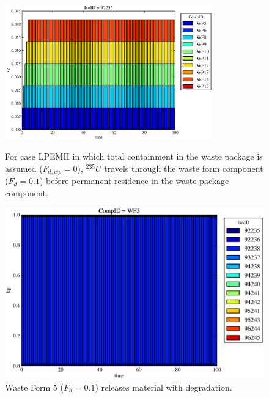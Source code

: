 \begin{figure}[ht]
\centering
\includegraphics[width=0.8\textwidth]{./chapters/demonstration/base/lpEMII.eps}
\caption[$^{235}U$ residence. Lumped Parameter  Waste Package No Release.]{
For case LPEMII in which total containment in the waste package is assumed 
($F_{d,wp}=0$), $^{235}U$ travels through the waste form component ($F_d = 0.1$) before 
permanent residence in the waste package component.
}
\label{fig:lpEMIIall}
\begin{minipage}[b]{0.45\linewidth}

  \includegraphics[width=\textwidth]{./chapters/demonstration/base/lpEMII1.eps}
  \caption[LPEMII Waste Form Contaminants.]{
    Waste Form 5 ($F_d = 0.1$) releases material with degradation. 
    }
  \label{fig:lpEMIIwf5}
  

\end{minipage}
\end{figure}
